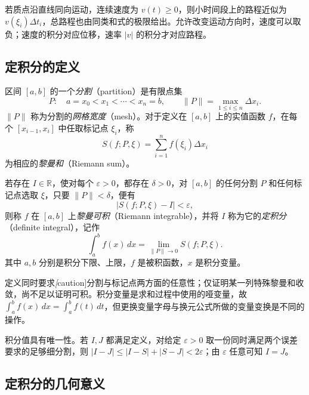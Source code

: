 若质点沿直线同向运动，连续速度为 $v(t)\geq0$，则小时间段上的路程近似为 $v(\xi_i)\Delta t_i$，总路程也由同类和式的极限给出。允许改变运动方向时，速度可以取负；速度的积分对应位移，速率 $|v|$ 的积分才对应路程。

\subsection{定积分的定义}
\label{subsec:definition-of-definite-integrals}

\begin{definition}
\label{def:partition-and-riemann-sum}
区间 $[a,b]$ 的一个\emph{分割}（partition）是有限点集
\[
    P:\quad a=x_0<x_1<\cdots<x_n=b,
    \qquad \|P\|=\max_{1\leq i\leq n}\Delta x_i.
\]
$\|P\|$ 称为分割的\emph{网格宽度}（mesh）。对于定义在 $[a,b]$ 上的实值函数 $f$，在每个 $[x_{i-1},x_i]$ 中任取标记点 $\xi_i$，称
\[
    S(f;P,\xi)=\sum_{i=1}^n f(\xi_i)\Delta x_i
\]
为相应的\emph{黎曼和}（Riemann sum）。
\end{definition}

\begin{definition}
\label{def:riemann-definite-integral}
若存在 $I\in\mathbb R$，使对每个 $\varepsilon>0$，都存在 $\delta>0$，对 $[a,b]$ 的任何分割 $P$ 和任何标记点选取 $\xi$，只要 $\|P\|<\delta$，便有
\[
    |S(f;P,\xi)-I|<\varepsilon,
\]
则称 $f$ 在 $[a,b]$ 上\emph{黎曼可积}（Riemann integrable），并将 $I$ 称为它的\emph{定积分}（definite integral），记作
\begin{equation}
    \int_a^b f(x)\,dx=\lim_{\|P\|\to0}S(f;P,\xi).
    \label{eq:riemann-integral-definition}
\end{equation}
其中 $a,b$ 分别是积分下限、上限，$f$ 是被积函数，$x$ 是积分变量。
\end{definition}

定义同时要求\emph[caution]{分割与标记点两方面的任意性}；仅证明某一列特殊黎曼和收敛，尚不足以证明可积。积分变量是求和过程中使用的哑变量，故 $\int_a^b f(x)\,dx=\int_a^b f(t)\,dt$，但更换变量字母与换元公式所做的变量变换是不同的操作。

积分值具有唯一性。若 $I,J$ 都满足定义，对给定 $\varepsilon>0$ 取一份同时满足两个误差要求的足够细分割，则 $|I-J|\leq|I-S|+|S-J|<2\varepsilon$；由 $\varepsilon$ 任意可知 $I=J$。

\subsection{定积分的几何意义}
\label{subsec:geometric-meaning-of-definite-integrals}

